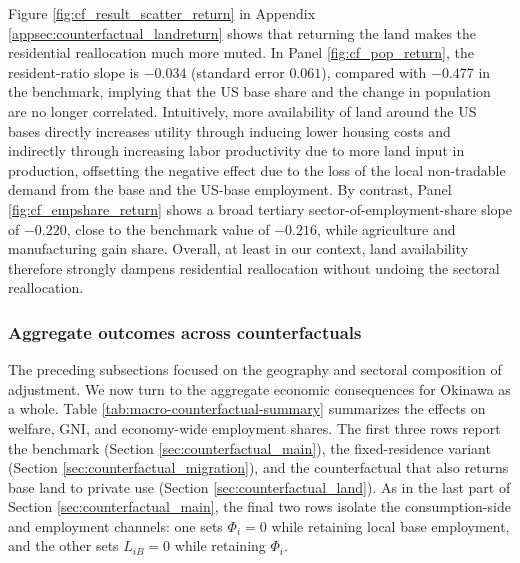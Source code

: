 \documentclass[12pt, unicode, a4paper]{article}
\newcommand{\1}{\mbox{1}\hspace{-0.25em}\mbox{l}} %
\begin{document}
Figure \ref{fig:cf_result_scatter_return} in Appendix \ref{appsec:counterfactual_landreturn} shows that returning the land makes the residential reallocation much more muted. In Panel \ref{fig:cf_pop_return}, the resident-ratio slope is $-0.034$ (standard error $0.061$), compared with $-0.477$ in the benchmark, implying that the US base share and the change in population are no longer correlated. 
Intuitively, more availability of land around the US bases directly increases utility through inducing lower housing costs and indirectly through increasing labor productivity due to more land input in production, offsetting the negative effect due to the loss of the local non-tradable demand from the base and the US-base employment.
By contrast, Panel \ref{fig:cf_empshare_return} shows a broad tertiary sector-of-employment-share slope of $-0.220$, close to the benchmark value of $-0.216$, while agriculture and manufacturing gain share. Overall, at least in our context, land availability therefore strongly dampens residential reallocation without undoing the sectoral reallocation.


\subsubsection{Aggregate outcomes across counterfactuals}\label{sec:counterfactual_aggregate}

The preceding subsections focused on the geography and sectoral composition of adjustment. We now turn to the aggregate economic consequences for Okinawa as a whole. Table \ref{tab:macro-counterfactual-summary} summarizes the effects on welfare, GNI, and economy-wide employment shares. The first three rows report the benchmark (Section \ref{sec:counterfactual_main}), the fixed-residence variant (Section \ref{sec:counterfactual_migration}), and the counterfactual that also returns base land to private use (Section \ref{sec:counterfactual_land}). As in the last part of Section \ref{sec:counterfactual_main}, the final two rows isolate the consumption-side and employment channels: one sets $\Phi_i=0$ while retaining local base employment, and the other sets $L_{iB}=0$ while retaining $\Phi_i$. 
\end{document}
